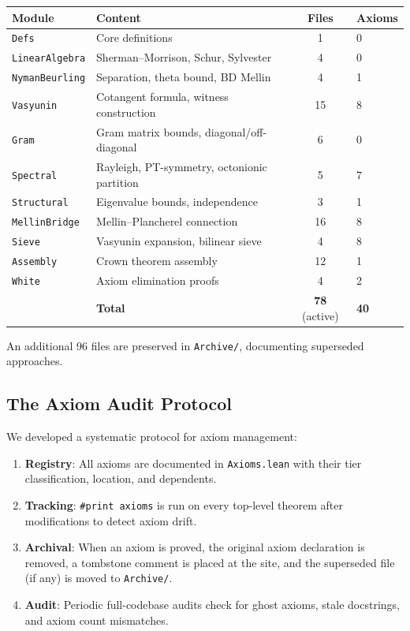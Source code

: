 \documentclass[11pt,a4paper]{article}
\theoremstyle{plain}
\theoremstyle{definition}
\theoremstyle{remark}
\newcommand{\lean}[1]{\texttt{#1}}
\begin{document}
\begin{center}
\small
\begin{tabular}{@{}llcl@{}}
\toprule
\textbf{Module} & \textbf{Content} & \textbf{Files} & \textbf{Axioms} \\
\midrule
\lean{Defs} & Core definitions & 1 & 0 \\
\lean{LinearAlgebra} & Sherman--Morrison, Schur, Sylvester & 4 & 0 \\
\lean{NymanBeurling} & Separation, theta bound, BD Mellin & 4 & 1 \\
\lean{Vasyunin} & Cotangent formula, witness construction & 15 & 8 \\
\lean{Gram} & Gram matrix bounds, diagonal/off-diagonal & 6 & 0 \\
\lean{Spectral} & Rayleigh, PT-symmetry, octonionic partition & 5 & 7 \\
\lean{Structural} & Eigenvalue bounds, independence & 3 & 1 \\
\lean{MellinBridge} & Mellin--Plancherel connection & 16 & 8 \\
\lean{Sieve} & Vasyunin expansion, bilinear sieve & 4 & 8 \\
\lean{Assembly} & Crown theorem assembly & 12 & 1 \\
\lean{White} & Axiom elimination proofs & 4 & 2 \\
\midrule
& \textbf{Total} & \textbf{78} (active) & \textbf{40} \\
\bottomrule
\end{tabular}
\end{center}

An additional 96 files are preserved in \lean{Archive/}, documenting
superseded approaches.

\subsection{The Axiom Audit Protocol}

We developed a systematic protocol for axiom management:

\begin{enumerate}
  \item \textbf{Registry}: All axioms are documented in
    \lean{Axioms.lean} with their tier classification, location,
    and dependents.
  \item \textbf{Tracking}: \lean{\#print axioms} is run on every
    top-level theorem after modifications to detect axiom drift.
  \item \textbf{Archival}: When an axiom is proved, the original
    axiom declaration is removed, a tombstone comment is placed
    at the site, and the superseded file (if any) is moved to
    \lean{Archive/}.
  \item \textbf{Audit}: Periodic full-codebase audits check for
    ghost axioms, stale docstrings, and axiom count mismatches.
\end{enumerate}
\end{document}
